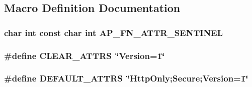 \subsection{Macro Definition Documentation}
\subsubsection[{\texorpdfstring{A\+P\+\_\+\+F\+N\+\_\+\+A\+T\+T\+R\+\_\+\+S\+E\+N\+T\+I\+N\+EL}{AP_FN_ATTR_SENTINEL}}]{\setlength{\rightskip}{0pt plus 5cm}char {\bf int} const char {\bf int} A\+P\+\_\+\+F\+N\+\_\+\+A\+T\+T\+R\+\_\+\+S\+E\+N\+T\+I\+N\+EL}\hypertarget{group__APACHE__CORE__COOKIE_ga2862bb7a008daea7f74384d50f69ef68}{}\label{group__APACHE__CORE__COOKIE_ga2862bb7a008daea7f74384d50f69ef68}
\subsubsection[{\texorpdfstring{C\+L\+E\+A\+R\+\_\+\+A\+T\+T\+RS}{CLEAR_ATTRS}}]{\setlength{\rightskip}{0pt plus 5cm}\#define C\+L\+E\+A\+R\+\_\+\+A\+T\+T\+RS~\char`\"{}Version=1\char`\"{}}\hypertarget{group__APACHE__CORE__COOKIE_ga5497d3ec4bb5c32dad3217557f6d58c1}{}\label{group__APACHE__CORE__COOKIE_ga5497d3ec4bb5c32dad3217557f6d58c1}
\subsubsection[{\texorpdfstring{D\+E\+F\+A\+U\+L\+T\+\_\+\+A\+T\+T\+RS}{DEFAULT_ATTRS}}]{\setlength{\rightskip}{0pt plus 5cm}\#define D\+E\+F\+A\+U\+L\+T\+\_\+\+A\+T\+T\+RS~\char`\"{}Http\+Only;Secure;Version=1\char`\"{}}\hypertarget{group__APACHE__CORE__COOKIE_ga5637644ceca6966eee1ad8be41ebd664}{}\label{group__APACHE__CORE__COOKIE_ga5637644ceca6966eee1ad8be41ebd664}
